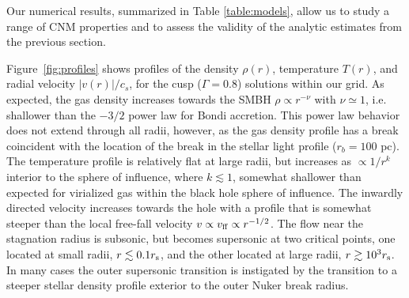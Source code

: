 \documentclass[usenatbib,fleqn]{mn2e}
\newcommand{\rb}{r_b}
\newcommand{\Mbh}[1][]{M_{\bullet#1}}
\newcommand{\densSlope}{\nu}
\begin{document}

Our numerical results, summarized in Table \ref{table:models}, allow
us to study a range of CNM properties and to assess the validity of
the analytic estimates from the previous section.  

Figure~\ref{fig:profiles} shows profiles of the density $\rho(r)$,
temperature $T(r)$, and radial velocity $|v(r)|/c_s$, for the cusp ($\Gamma=0.8$) solutions within our
grid.  As expected, the gas density increases towards the SMBH
$\rho\propto r^{-\densSlope}$ with $\densSlope\simeq1$, i.e. shallower
than the $-3/2$ power law for Bondi accretion. This power law behavior
does not extend through all radii, however, as the gas density profile
has a break coincident with the location of the break in the stellar
light profile ($\rb=100$ pc). The temperature profile is relatively
flat at large radii, but increases as $\propto 1/r^{k}$ interior to
the sphere of influence, where $k\lesssim 1$, somewhat shallower than
expected for virialized gas within the black hole sphere of influence.
The inwardly directed velocity increases towards the hole with a
profile that is somewhat steeper than the local free-fall velocity $v
\propto v_{\rm ff}\propto r^{-1/2}$.  The flow near the stagnation
radius is subsonic, but becomes supersonic at two critical points, one
located at small radii, $r \lesssim 0.1r_{\rm s}$, and the other
located at large radii, $r \gtrsim 10^{3}r_{\rm s}$.  In many cases
the outer supersonic transition is instigated by the transition to a steeper
stellar density profile exterior to the outer Nuker break radius.
\end{document}
